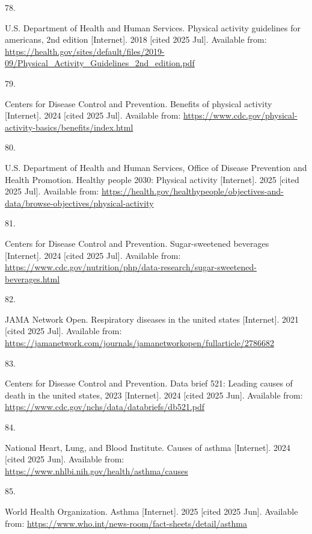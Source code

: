 \documentclass[
  english,
  letterpaper,
]{report}
\newlength{\cslhangindent}
\newlength{\csllabelwidth}
\newenvironment{CSLReferences}[2] %
 {\begin{list}{}{%
  \setlength{\itemindent}{0pt}
  \setlength{\leftmargin}{0pt}
  \setlength{\parsep}{0pt}
  \ifodd #1
   \setlength{\leftmargin}{\cslhangindent}
   \setlength{\itemindent}{-1\cslhangindent}
  \fi
  \setlength{\itemsep}{#2\baselineskip}}}
 {\end{list}}
\newcommand{\CSLLeftMargin}[1]{\parbox[t]{\csllabelwidth}{\strut#1\strut}}
\newcommand{\CSLRightInline}[1]{\parbox[t]{\linewidth - \csllabelwidth}{\strut#1\strut}}
\begin{document}
\begin{CSLReferences}{0}{1}
\CSLLeftMargin{78. }%
\CSLRightInline{U.S. Department of Health and Human Services. Physical
activity guidelines for americans, 2nd edition {[}Internet{]}. 2018
{[}cited 2025 Jul{]}. Available from:
\url{https://health.gov/sites/default/files/2019-09/Physical_Activity_Guidelines_2nd_edition.pdf}}

\CSLLeftMargin{79. }%
\CSLRightInline{Centers for Disease Control and Prevention. Benefits of
physical activity {[}Internet{]}. 2024 {[}cited 2025 Jul{]}. Available
from:
\url{https://www.cdc.gov/physical-activity-basics/benefits/index.html}}

\CSLLeftMargin{80. }%
\CSLRightInline{U.S. Department of Health and Human Services, Office of
Disease Prevention and Health Promotion. Healthy people 2030: Physical
activity {[}Internet{]}. 2025 {[}cited 2025 Jul{]}. Available from:
\url{https://health.gov/healthypeople/objectives-and-data/browse-objectives/physical-activity}}

\CSLLeftMargin{81. }%
\CSLRightInline{Centers for Disease Control and Prevention.
Sugar-sweetened beverages {[}Internet{]}. 2024 {[}cited 2025 Jul{]}.
Available from:
\url{https://www.cdc.gov/nutrition/php/data-research/sugar-sweetened-beverages.html}}

\CSLLeftMargin{82. }%
\CSLRightInline{JAMA Network Open. Respiratory diseases in the united
states {[}Internet{]}. 2021 {[}cited 2025 Jul{]}. Available from:
\url{https://jamanetwork.com/journals/jamanetworkopen/fullarticle/2786682}}

\CSLLeftMargin{83. }%
\CSLRightInline{Centers for Disease Control and Prevention. Data brief
521: Leading causes of death in the united states, 2023 {[}Internet{]}.
2024 {[}cited 2025 Jun{]}. Available from:
\url{https://www.cdc.gov/nchs/data/databriefs/db521.pdf}}

\CSLLeftMargin{84. }%
\CSLRightInline{National Heart, Lung, and Blood Institute. Causes of
asthma {[}Internet{]}. 2024 {[}cited 2025 Jun{]}. Available from:
\url{https://www.nhlbi.nih.gov/health/asthma/causes}}

\CSLLeftMargin{85. }%
\CSLRightInline{World Health Organization. Asthma {[}Internet{]}. 2025
{[}cited 2025 Jun{]}. Available from:
\url{https://www.who.int/news-room/fact-sheets/detail/asthma}}


\end{CSLReferences}
\end{document}
